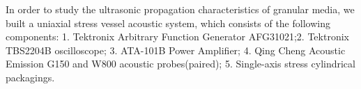 \begin{digest}

    In order to study the ultrasonic propagation characteristics of granular media, we built a uniaxial stress vessel acoustic system, which consists of the following components: 1. Tektronix Arbitrary Function Generator AFG31021;2. Tektronix TBS2204B oscilloscope; 3. ATA-101B Power Amplifier; 4. Qing Cheng Acoustic Emission G150 and W800 acoustic probes(paired); 5. Single-axis stress cylindrical packagings. 


\end{digest}
